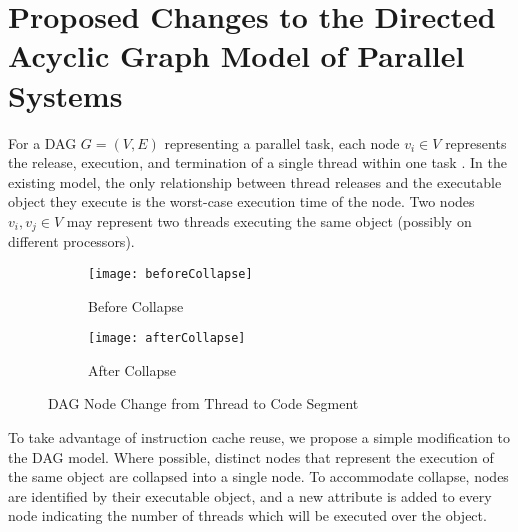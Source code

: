 \section{Proposed Changes to the Directed Acyclic Graph Model of Parallel Systems}

For a DAG ${G = (V, E)}$ representing a parallel task, each node ${v_i \in V}$ represents
the release, execution, and termination of a single thread within one task 
\addcite. In the existing model, the only relationship between thread releases and the executable object they execute is the worst-case execution time of the node. Two nodes ${v_i, v_j \in V}$ may represent two threads executing the same object (possibly on different processors).

\begin{figure}
  \centering
  \begin{subfigure}[b]{0.4\textwidth}{
      \texttt{[image: beforeCollapse]}
      \caption{Before Collapse}
      \label{fig:before-collapse}
    }
  \end{subfigure} \quad
  \begin{subfigure}[b]{0.4\textwidth}{
      \texttt{[image: afterCollapse]}
      \caption{After Collapse}
      \label{fig:after-collapse}
    }
  \end{subfigure}
  \caption{DAG Node Change from Thread to Code Segment}
  \label{fig:dag-change}
\end{figure}

To take advantage of instruction cache reuse, we propose a simple modification to the DAG
model. Where possible, distinct nodes that represent the execution of
the same object are collapsed into a single node. To accommodate collapse,
nodes are identified by their executable object, and a new attribute is added to every node
indicating the number of threads which will be executed over the object.


